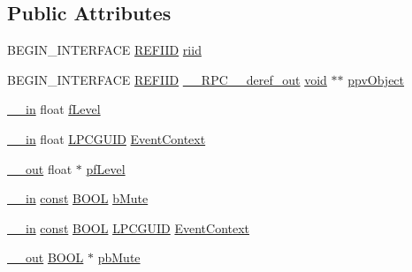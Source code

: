 \subsection*{Public Attributes}
\begin{DoxyCompactItemize}
\item 
B\+E\+G\+I\+N\+\_\+\+I\+N\+T\+E\+R\+F\+A\+CE \hyperlink{px__win__ds_8c_a80ec49c8ae61e234197d5071d2df497d}{R\+E\+F\+I\+ID} \hyperlink{struct_i_simple_audio_volume_vtbl_a3ac3e9a09d98c902de6fe173aa868bc1}{riid}
\item 
B\+E\+G\+I\+N\+\_\+\+I\+N\+T\+E\+R\+F\+A\+CE \hyperlink{px__win__ds_8c_a80ec49c8ae61e234197d5071d2df497d}{R\+E\+F\+I\+ID} \hyperlink{rpcsal_8h_a23bc188526f10656f9c79d950f6c3192}{\+\_\+\+\_\+\+R\+P\+C\+\_\+\+\_\+deref\+\_\+out} \hyperlink{sound_8c_ae35f5844602719cf66324f4de2a658b3}{void} $\ast$$\ast$ \hyperlink{struct_i_simple_audio_volume_vtbl_a13d23c293f79d9717749349baeaf5dce}{ppv\+Object}
\item 
\hyperlink{sal_8h_a3f6b8655e1aa9dfc15a9029f0343009e}{\+\_\+\+\_\+in} float \hyperlink{struct_i_simple_audio_volume_vtbl_a25f46aa26265c8ca1522802f3f2ba1c7}{f\+Level}
\item 
\hyperlink{sal_8h_a3f6b8655e1aa9dfc15a9029f0343009e}{\+\_\+\+\_\+in} float \hyperlink{pa__win__wasapi_8c_a9c061ab1f26db8746b3dab38991f48a0}{L\+P\+C\+G\+U\+ID} \hyperlink{struct_i_simple_audio_volume_vtbl_ad5ffe5e09cd10c0c145f8b83b9b2af81}{Event\+Context}
\item 
\hyperlink{sal_8h_abb4c3c1135aab6c47cff22e7c16efb74}{\+\_\+\+\_\+out} float $\ast$ \hyperlink{struct_i_simple_audio_volume_vtbl_adac9e6ab94d274122b56d561abde6b35}{pf\+Level}
\item 
\hyperlink{sal_8h_a3f6b8655e1aa9dfc15a9029f0343009e}{\+\_\+\+\_\+in} \hyperlink{getopt1_8c_a2c212835823e3c54a8ab6d95c652660e}{const} \hyperlink{nfilterkit_8h_a3be13892ae7076009afcf121347dd319}{B\+O\+OL} \hyperlink{struct_i_simple_audio_volume_vtbl_a4d2e8166304b1d7630b9fdf4faca4d67}{b\+Mute}
\item 
\hyperlink{sal_8h_a3f6b8655e1aa9dfc15a9029f0343009e}{\+\_\+\+\_\+in} \hyperlink{getopt1_8c_a2c212835823e3c54a8ab6d95c652660e}{const} \hyperlink{nfilterkit_8h_a3be13892ae7076009afcf121347dd319}{B\+O\+OL} \hyperlink{pa__win__wasapi_8c_a9c061ab1f26db8746b3dab38991f48a0}{L\+P\+C\+G\+U\+ID} \hyperlink{struct_i_simple_audio_volume_vtbl_a8fa97fd6965de87b110334273eb4fbf7}{Event\+Context}
\item 
\hyperlink{sal_8h_abb4c3c1135aab6c47cff22e7c16efb74}{\+\_\+\+\_\+out} \hyperlink{nfilterkit_8h_a3be13892ae7076009afcf121347dd319}{B\+O\+OL} $\ast$ \hyperlink{struct_i_simple_audio_volume_vtbl_ad5daabadd9726de484b3ea6e7ec07e91}{pb\+Mute}
\end{DoxyCompactItemize}


